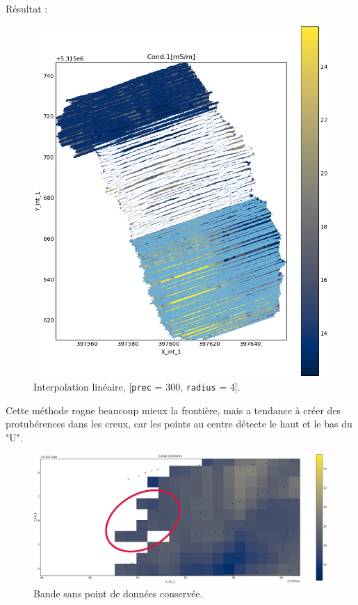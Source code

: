 \documentclass[12pt]{article}
\begin{document}
\newpage
    Résultat :

    \begin{figure}[ht!]
        \centering
        \includegraphics[width=\textwidth]{Images/Grid_SecondAlg_r4p300.png}
        \caption{Interpolation linéaire, [\texttt{prec} = 300, \texttt{radius} = 4].}
    \end{figure}

    Cette méthode rogne beaucoup mieux la frontière, mais a tendance à créer des protubérences dans les creux, car les points au centre détecte le haut et le bas du "U".

    \begin{figure}[ht!]
        \centering
        \includegraphics[width=\textwidth]{Images/Grid_SecondAlg_Hallucination.png}
        \caption{Bande sans point de données conservée.}
    \end{figure}
\end{document}
